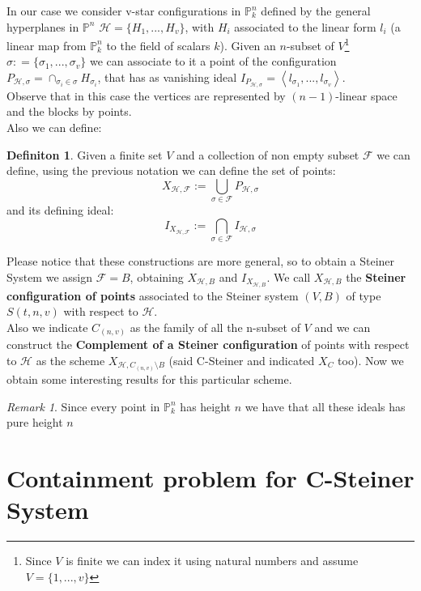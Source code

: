 \documentclass[notitlepage, a4]{book}
\theoremstyle{plain}
\theoremstyle{remark}
\newtheorem{rem}{Remark}
\theoremstyle{definition}
\newtheorem{deff}[teo]{Definiton}
\newcommand{\PP}{\mathbb{P}}
\newcommand{\HH}{\mathcal{H}}
\begin{document}
In our case we consider v-star configurations in $ \PP_k^n $ defined by the general hyperplanes in $ \PP^n $ $ \HH  = \{ H_1 , ... , H_v\}$, with $ H_i $ associated to the linear form $ l_i $ (a linear map from $ \PP_k^n $ to the field of scalars $ k $). Given an $ n $-subset of $ V $\footnote{Since $ V $ is finite we can index it using natural numbers and assume $ V = \{ 1 , ... , v\} $} $ \sigma : = \{ \sigma_1 , ... , \sigma_v\}$ we can associate to it a point of the configuration $ P_{\HH, \sigma }= \cap_{\sigma_i \in \sigma} H_{\sigma_i}$, that has as vanishing ideal $ I_{P_{\HH, \sigma}} = \left< l_{\sigma_1} , ... , l_{\sigma_v} \right\rangle $.\\
 Observe that in this case the vertices are represented by $( n-1 )$-linear space and the blocks by points.\\
 Also we can define:
 \begin{deff}\label{def:gensys}
 Given a finite set $ V $ and a collection of non empty subset $ \mathcal{F} $ we can define, using the previous notation we can define the set of points:
 \begin{equation}\label{eq:X}
 X_{\HH , \mathcal{F}}:= \bigcup_{\sigma \in \mathcal{F} } P_{\HH, \sigma }
 \end{equation}
 and its defining ideal:
 \begin{equation}\label{eq:I}
 I_{X_{\HH , \mathcal{F}}}:= \bigcap_{\sigma \in \mathcal{F} } I_{\HH, \sigma }
 \end{equation}
 \end{deff}
 Please notice that these constructions are more general, so to obtain a Steiner System we assign $ \mathcal{F}=B $, obtaining $ X_{\HH , B} $ and $  I_{X_{\HH , B}} $. 
 We call  $ X_{\HH , B} $ the \textbf{Steiner configuration of points} associated to the Steiner system $ (V , B) $ of type $ S(t , n,v) $ with respect to $ \HH $. \\
 Also we indicate $ C_{(n,v)} $ as the family of all the n-subset of $ V $ and we can construct the \textbf{Complement of a Steiner configuration} of points with respect to $ \HH $ as the scheme $ X_{\HH , C_{(n,v)} \setminus B} $ (said C-Steiner and indicated $ X_C $ too).
Now we obtain some interesting results for this particular scheme. 
\begin{rem}
Since every point in $ \PP_k^n $ has height $ n $ we have that all these ideals has pure height $ n $
\end{rem}
 
 \section{Containment problem for C-Steiner System}
 
\end{document}
